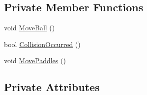 \subsection*{Private Member Functions}
\begin{DoxyCompactItemize}
\item 
void \hyperlink{class_ping___pong_1_1_game1_a61c60e00745df4154dde945cde16c7af}{Move\-Ball} ()
\item 
bool \hyperlink{class_ping___pong_1_1_game1_ad34fe9d81909ad797beb7670ebf3594d}{Collision\-Occurred} ()
\item 
void \hyperlink{class_ping___pong_1_1_game1_a545c655f415d2de1f372a6eed77e0231}{Move\-Paddles} ()
\end{DoxyCompactItemize}
\subsection*{Private Attributes}
